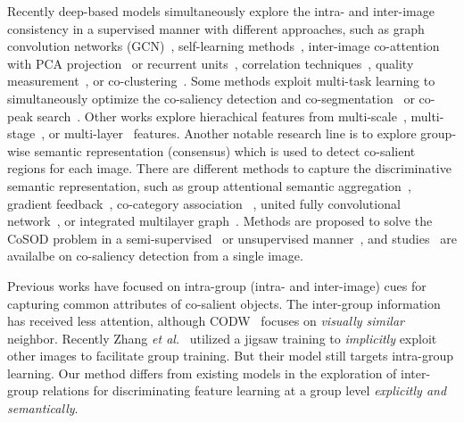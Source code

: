 \documentclass[final]{cvpr}
\begin{document}
Recently deep-based models simultaneously explore the intra- and inter-image consistency in a supervised manner with different approaches, such as graph convolution networks (GCN)~\cite{jiang2019unified,jiang2019multiple,zhang2020adaptive}, self-learning methods~\cite{zhang2016co,zhang2015cosaliency}, inter-image co-attention with PCA projection~\cite{deng2020re} or recurrent units~\cite{li2019detecting}, correlation techniques~\cite{icnet2020nips}, quality measurement~\cite{jerripothula2018quality}, or co-clustering~\cite{yao2017revisiting}. Some methods exploit multi-task learning to simultaneously optimize the co-saliency detection and co-segmentation~\cite{tsai2018image} or co-peak search~\cite{hsu2019deepco3}. Other works explore hierachical features from multi-scale~\cite{zhang2019co}, multi-stage~\cite{li2018deep}, or multi-layer~\cite{ren2020co} features. Another notable research line is to explore  group-wise semantic representation (consensus) which is used to detect co-salient regions for each image. There are different methods to capture the discriminative semantic representation, such as group attentional semantic aggregation~\cite{coadnet2020nips}, gradient feedback~\cite{zhang2020gradient}, co-category association ~\cite{wang2019robust}, united fully convolutional network~\cite{wei2019deep,wei2017group}, or integrated multilayer graph~\cite{jeong2018co}.  Methods are proposed to solve the CoSOD problem in a semi-supervised~\cite{zheng2018feature} or unsupervised manner~\cite{hsu2018unsupervised,zhang2017supervision,hsu2018co,li2019co}, and studies~\cite{yu2018co,song2019easy} are availalbe on co-saliency detection from a single image.

Previous works have focused on  intra-group (intra- and inter-image) cues for capturing common attributes of co-salient objects. The inter-group information
has received less attention, although CODW~\cite{zhang2016detection} focuses on \textit{visually similar} neighbor.
Recently Zhang \textit{et al.}~\cite{zhang2020gradient} utilized a jigsaw training to \textit{implicitly} exploit other images to facilitate group training. But their model still targets intra-group learning. Our method differs from existing models in the exploration of inter-group relations for discriminating feature learning at a group level \textit{explicitly and semantically}.
\end{document}
